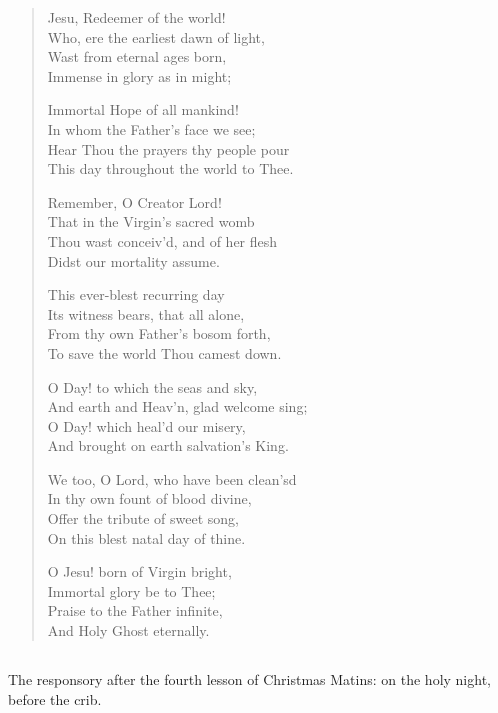 \begin{verse}
Jesu, Redeemer of the world! \\
Who, ere the earliest dawn of light, \\
Wast from eternal ages born, \\
Immense in glory as in might;

Immortal Hope of all mankind! \\
In whom the Father's face we see; \\
Hear Thou the prayers thy people pour \\
This day throughout the world to Thee.

Remember, O Creator Lord! \\
That in the Virgin's sacred womb \\
Thou wast conceiv'd, and of her flesh \\
Didst our mortality assume.

This ever-blest recurring day \\
Its witness bears, that all alone, \\
From thy own Father's bosom forth, \\
To save the world Thou camest down.

O Day! to which the seas and sky, \\
And earth and Heav'n, glad welcome sing; \\
O Day! which heal'd our misery, \\
And brought on earth salvation's King.

We too, O Lord, who have been clean'sd \\
In thy own fount of blood divine, \\
Offer the tribute of sweet song, \\
On this blest natal day of thine.

O Jesu! born of Virgin bright, \\
Immortal glory be to Thee; \\
Praise to the Father infinite, \\
And Holy Ghost eternally.
\end{verse}

\subsection{}

The responsory after the fourth lesson of Christmas Matins: on the holy night,
before the crib.

